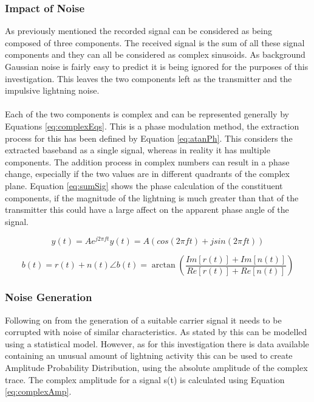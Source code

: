 \subsubsection{Impact of Noise}
As previously mentioned the recorded signal can be considered as being composed of three components. The received signal is the sum of all these signal components and they can all be considered as complex sinusoids. As background Gaussian noise is fairly easy to predict it is being ignored for the purposes of this investigation. This leaves the two components left as the transmitter and the impulsive lightning noise. 
\\\\
Each of the two components is complex and can be represented generally by Equations \ref{eq:complexEqs}. This is a phase modulation method, the extraction process for this has been defined by Equation \ref{eq:atanPh}. This considers the extracted baseband as a single signal, whereas in reality it has multiple components. The addition process in complex numbers can result in a phase change, especially if the two values are in different quadrants of the complex plane. Equation \ref{eq:sumSig} shows the phase calculation of the constituent components, if the magnitude of the lightning is much greater than that of the transmitter this could have a large affect on the apparent phase angle of the signal. 

\begin{subequations}
\begin{equation}
    y(t) = Ae^{j2\pi f t}
    \label{eq:complexsine}
\end{equation}
\begin{equation}
    y(t) = A(cos(2\pi ft) + jsin(2\pi ft))
    \label{eq:complexsine2}
\end{equation}
\label{eq:complexEqs}
\end{subequations}

\begin{subequations}
\begin{equation}
    b(t) = r(t) + n(t)
\end{equation}
\begin{equation}
    \angle b(t) = \arctan\left(\frac{Im[r(t)]+Im[n(t)]}{Re[r(t)]+Re[n(t)]}\right)
    \label{eq:sumSig}
\end{equation}
\end{subequations}
\subsubsection{Noise Generation}
Following on from the generation of a suitable carrier signal it needs to be corrupted with noise of similar characteristics. As stated by \cite{Chrissan2000} this can be modelled using a statistical model. However, as for this investigation there is data available containing an unusual amount of lightning activity this can be used to create Amplitude Probability Distribution, using the absolute amplitude of the complex trace. The complex amplitude for a signal s(t) is calculated using Equation \ref{eq:complexAmp}.

